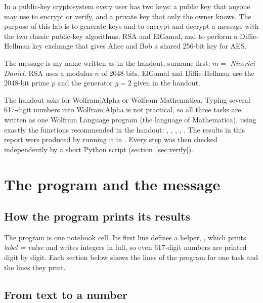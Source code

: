 \documentclass[11pt,a4paper]{article}
\begin{document}
\utmtitlepage
\tableofcontents
\newpage


In a public-key cryptosystem every user has two keys: a public key that anyone may use to encrypt
or verify, and a private key that only the owner knows. The purpose of this lab is to generate keys
and to encrypt and decrypt a message with the two classic public-key algorithms, RSA and ElGamal,
and to perform a Diffie-Hellman key exchange that gives Alice and Bob a shared 256-bit key for AES.

The message is my name written as in the handout, surname first: $m = $ \textit{Nicorici Daniel}.
RSA uses a modulus $n$ of 2048 bits. ElGamal and Diffie-Hellman use the 2048-bit prime $p$ and the
generator $g = 2$ given in the handout.

The handout asks for Wolfram|Alpha or Wolfram Mathematica. Typing several 617-digit numbers into
Wolfram|Alpha is not practical, so all three tasks are written as one Wolfram Language program
(the language of Mathematica), using exactly the functions recommended in the handout:
, , , , . The
results in this report were produced by running it in \tool. Every step was then checked
independently by a short Python script (section~\ref{sec:verify}).

\section{The program and the message}

\subsection{How the program prints its results}

The program is one notebook cell. Its first line defines a helper, , which prints
\textit{label = value} and writes integers in full, so even 617-digit numbers are printed digit by
digit. Each section below shows the lines of the program for one task and the lines they print.



\subsection{From text to a number}
\end{document}
